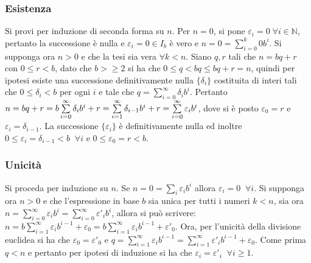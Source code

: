 \subsubsection{Esistenza}
Si provi per induzione di seconda forma su $n$. Per $n=0$, si pone $\varepsilon_i=0\;\forall i\in\mathbb{N}$, pertanto la successione \`e nulla e $\varepsilon_i=0\in I_b$ \`e 
vero e $n=0=\sum\limits_{i=0}^k0b^i$. Si supponga ora $n>0$ e che la tesi sia vera $\forall k<n$. Siano $q,r$ tali che $n=bq+r$ con $0\le r<b$, dato che $b>\ge 2$ si ha che 
$0\le q<bq \le bq+r=n$, quindi per ipotesi esiste una successione definitivamente nulla $\{\delta_i\}$ costituita di interi tali che $0\le\delta_i<b$ per ogni $i$ e tale che $q=
\sum\limits_{i=0}^\infty\delta_ib^i$. Pertanto $n=bq+r=b\sum\limits\limits_{i=0}^\infty\delta_ib^i+r=\sum\limits\limits_{i=1}^\infty\delta_{i-1}b^i+r=\sum\limits\limits_{i=0}^
\infty\varepsilon_ib^i$, dove si \`e posto $\varepsilon_0=r$ e $\varepsilon_i=\delta_{i-1}$. La successione $\{\varepsilon_i\}$ \`e definitivamente nulla ed inoltre $0\le 
\varepsilon_i=\delta_{i-1}<b\;\;\forall i$ e $0\le \varepsilon_0=r<b$.
\subsubsection{Unicit\`a}
Si proceda per induzione su $n$. Se $n=0=\sum\limits_i\varepsilon_ib^i$ allora $\varepsilon_i=0\;\;\forall i$. Si supponga ora $n>0$ e che l'espressione in base $b$ sia unica 
per tutti i numeri $k<n$, sia ora $n=\sum\limits_{i=0}^\infty\varepsilon_ib^{i}=\sum\limits_{i=0}^\infty\varepsilon'_ib^{i}$, allora si pu\`o scrivere: $n=b\sum\limits_{i=1}^
\infty\varepsilon_ib^{i-1}+\varepsilon_0=b\sum\limits_{i=1}^\infty\varepsilon_ib^{i-1}+\varepsilon'_0$. Ora, per l'unicit\`a della divisione euclidea si ha che $\varepsilon_0=
\varepsilon'_0$ e $q=\sum\limits_{i=1}^\infty\varepsilon_ib^{i-1}=\sum\limits_{i=1}^\infty\varepsilon'_ib^{i-1}+\varepsilon_0$. Come prima $q<n$ e pertanto per ipotesi di 
induzione si ha che $\varepsilon_i=\varepsilon'_i\;\;\forall i\ge 1$.
